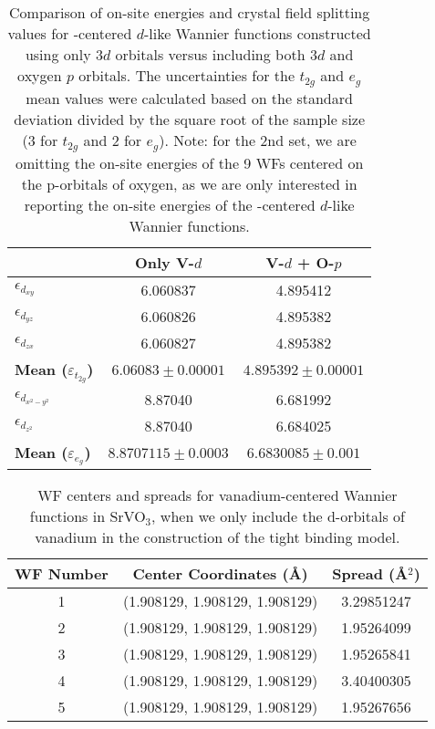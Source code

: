 \documentclass[%
 reprint,
 amsmath,amssymb,
 aps,
]{revtex4-2}
\begin{document}
\appendix

\section{}
\begin{table}[H]
\centering
\begin{tabular}{|l|c|c|}
\hline
 & \textbf{Only V-\(d\)} & \textbf{V-\(d\) + O-\(p\)} \\ \hline
$\epsilon_{d_{xy}}$ &  6.060837 &  4.895412 \\ \hline
$\epsilon_{d_{yz}}$ & 6.060826 & 4.895382 \\ \hline
$\epsilon_{d_{zx}}$ &  6.060827 & 4.895382 \\ \hline
\textbf{Mean ($ \varepsilon_{t_{2g}}$)} & \(6.06083 \pm 0.00001 \) & \(4.895392 \pm 0.00001 \) \\ \hline
$\epsilon_{d_{x^2-y^2}}$ & 8.87040  & 6.681992 \\ \hline
$\epsilon_{d_{z^2}}$ & 8.87040  & 6.684025\\ \hline
\textbf{Mean ($ \varepsilon_{e_{g}}$)} & $8.8707115  \pm  0.0003$  &\(6.6830085 \pm 0.001 \) \\ \hline
\end{tabular}
\label{table:SrVO3-onsite-energies}
\caption{Comparison of on-site energies and crystal field splitting values for -centered \(d\)-like Wannier functions constructed using only \(3d\) orbitals versus including both \(3d\) and oxygen \(p\) orbitals. The uncertainties for the \(t_{2g}\) and \(e_g\) mean values were calculated based on the standard deviation divided by the square root of the sample size (3 for \(t_{2g}\) and 2 for \(e_g\)). Note: for the 2nd set, we are omitting the on-site energies of the 9 WFs centered on the p-orbitals of oxygen, as we are only interested in reporting the on-site energies of the -centered \(d\)-like Wannier functions.}
\end{table}

\begin{table}[H]
\centering

\begin{tabular}{|c|c|c|}
\hline
\textbf{WF Number} & \textbf{Center Coordinates (Å)} & \textbf{Spread (Å\(^2\))} \\ \hline
1 & (1.908129, 1.908129, 1.908129) & 3.29851247 \\ \hline
2 & (1.908129, 1.908129, 1.908129) & 1.95264099 \\ \hline
3 & (1.908129, 1.908129, 1.908129) & 1.95265841 \\ \hline
4 & (1.908129, 1.908129, 1.908129) & 3.40400305 \\ \hline
5 & (1.908129, 1.908129, 1.908129) & 1.95267656 \\ \hline
\end{tabular}
 \label{table:wannier-centers-SrVO3}
 \caption{WF centers and spreads for vanadium-centered Wannier functions in SrVO\(_3\), when we only include the d-orbitals of vanadium in the construction of the tight binding model.}
\end{table}
\end{document}
